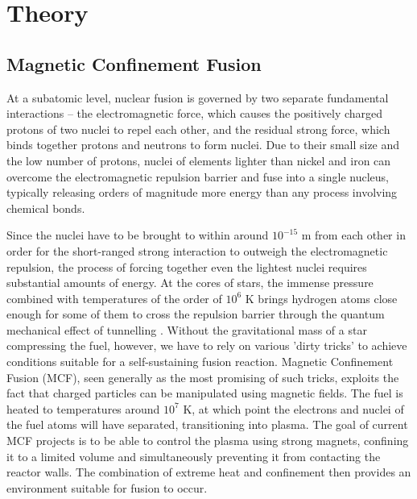 \chapter{Theory}

\section{Magnetic Confinement Fusion}
At a subatomic level, nuclear fusion is governed by two separate fundamental interactions -- the electromagnetic force, which causes the positively charged protons of two nuclei to repel each other, and the residual strong force, which binds together protons and neutrons to form nuclei. 
Due to their small size and the low number of protons, nuclei of elements lighter than nickel and iron can overcome the electromagnetic repulsion barrier and fuse into a single nucleus, typically releasing orders of magnitude more energy than any process involving chemical bonds.

Since the nuclei have to be brought to within around $10^{-15}$ m from each other in order for the short-ranged strong interaction to outweigh the electromagnetic repulsion, the process of forcing together even the lightest nuclei requires substantial amounts of energy.  
At the cores of stars, the immense pressure combined with temperatures of the order of $10^6$ K brings hydrogen atoms close enough for some of them to cross the repulsion barrier through the quantum mechanical effect of tunnelling \cite{clayton1983principles}.
Without the gravitational mass of a star compressing the fuel, however, we have to rely on various 'dirty tricks' to achieve conditions suitable for a self-sustaining fusion reaction. 
Magnetic Confinement Fusion (MCF), seen generally as the most promising of such tricks, exploits the fact that charged particles can be manipulated using magnetic fields. 
The fuel is heated to temperatures around $10^7$ K, at which point the electrons and nuclei of the fuel atoms will have separated, transitioning into plasma. 
The goal of current MCF projects is to be able to control the plasma using strong magnets, confining it to a limited volume and simultaneously preventing it from contacting the reactor walls.
The combination of extreme heat and confinement then provides an environment suitable for fusion to occur.

